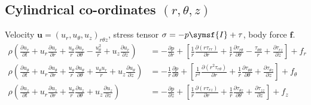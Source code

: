 \documentclass{jknotes}
\begin{document}
\subsection{Cylindrical co-ordinates $(r,\theta,z)$}
Velocity $\symbf{u} = (u_r, u_\theta, u_z)_{r\theta z}$, stress tensor $\sigma
= -p \symsf{I} + \tau$, body force $\symbf{f}$.
\begingroup
\addtolength{\jot}{.7em}
\begin{align}
	\rho\left(\frac{\partial u_r}{\partial t} + u_r \frac{\partial
	u_r}{\partial r} + \frac{u_\theta}{r} \frac{\partial u_r}{\partial \theta} 
	- \frac{u_\theta^2}{r} + u_z\frac{\partial u_r}{\partial z}\right) &= 
	-\frac{\partial p}{\partial r} + \left[ \frac{1}{r}
	\frac{\partial(r\tau_{rr})}{\partial r} + \frac{1}{r}\frac{\partial
	\tau_{r\theta}}{\partial \theta} - \frac{\tau_{\theta\theta}}{r} +
	\frac{\partial \tau_{rz}}{\partial z}\right] + f_r 
	\\[-1.4em]
	\rho\left(\frac{\partial u_\theta}{\partial t} + u_r \frac{\partial
	u_\theta}{\partial r} + \frac{u_\theta}{r}\frac{\partial u_\theta}{\partial
	\theta} + \frac{u_\theta u_r}{r} + u_z \frac{\partial
	u_\theta}{\partial z}\right) &= -\frac{1}{r} \frac{\partial p}{\partial
	\theta} + \left[\frac{1}{r^2}\frac{\partial (r^2 \tau_{r\theta})}{\partial
	r} + \frac{1}{r}\frac{\partial \tau_{\theta\theta}}{\partial \theta} +
	\frac{\partial \tau_{\theta z}}{\partial z} \right] + f_{\theta}\\
	\rho\left( \frac{\partial u_z}{\partial t} + u_r \frac{\partial
	u_z}{\partial r} + \frac{u_\theta}{r} \frac{\partial u_z}{\partial
	\theta} + u_z \frac{\partial u_z}{\partial z} \right) &=
	-\frac{\partial p}{\partial z} + \left[ \frac{1}{r}\frac{\partial
	(r\tau_{rz})}{\partial r} + \frac{1}{r}\frac{\partial
	\tau_{\theta z}}{\partial \theta} + \frac{\partial \tau_{zz}}{\partial
	z}\right] + f_z
\end{align}
\endgroup
\end{document}
